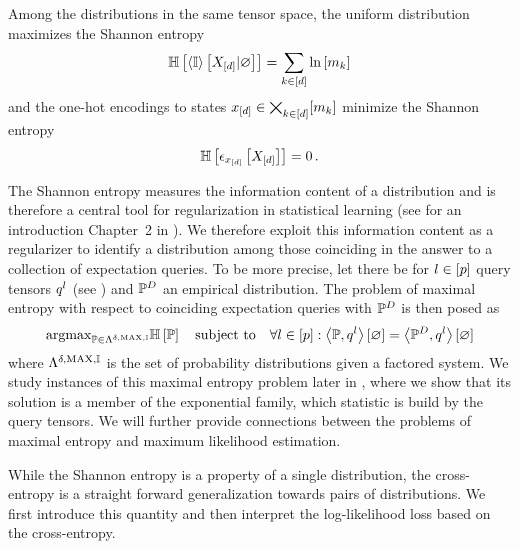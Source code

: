 Among the distributions in the same tensor space, the uniform distribution maximizes the Shannon entropy
\begin{align*}
    \mathbb{H}\left[\left\langle \mathbb{I}\right\rangle \left[ X_{[d]} | \varnothing \right]\right] = \sum_{k\in[d]}\ln \left[ m_{k} \right]
\end{align*}
and the one-hot encodings to states $x_{[d]}\in\bigtimes_{k\in[d]}[m_{k}]$ minimize the Shannon entropy
\begin{align*}
    \mathbb{H}\left[\epsilon_{x_{[d]}}\left[X_{[d]}\right]\right] = 0 \, .
\end{align*}

The Shannon entropy measures the information content of a distribution and is therefore a central tool for regularization in statistical learning (see for an introduction Chapter~2 in \cite{mackay_information_2003}).
We therefore exploit this information content as a regularizer to identify a distribution among those coinciding in the answer to a collection of expectation queries.
To be more precise, let there be for $l\in[p]$ query tensors $q^{l}$ (see ) and $\mathbb{P}^{D}$ an empirical distribution.
The problem of maximal entropy with respect to coinciding expectation queries with $\mathbb{P}^{D}$ is then posed as
\begin{align*}
    \mathrm{argmax}_{\mathbb{P}\in\Lambda^{\delta,\mathrm{MAX},\mathbb{I}}} \mathbb{H}\left[\mathbb{P}\right] \quad \text{subject to} \quad \forall{l\in[p]}:{\left\langle \mathbb{P},q^{l}\right\rangle \left[ \varnothing \right] = \left\langle \mathbb{P}^{D},q^{l}\right\rangle \left[ \varnothing \right]}
\end{align*}
where $\Lambda^{\delta,\mathrm{MAX},\mathbb{I}}$ is the set of probability distributions given a factored system.
We study instances of this maximal entropy problem later in , where we show that its solution is a member of the exponential family, which statistic is build by the query tensors.
We will further provide connections between the problems of maximal entropy and maximum likelihood estimation.

While the Shannon entropy is a property of a single distribution, the cross-entropy is a straight forward generalization towards pairs of distributions.
We first introduce this quantity and then interpret the log-likelihood loss based on the cross-entropy.

